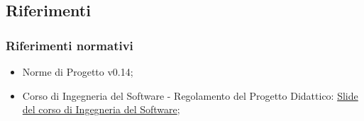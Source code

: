 \subsection{Riferimenti}
\label{subsec:Riferimenti}

\subsubsection{Riferimenti normativi}
\label{subsubsec:RiferimentiNormativi}
\begin{itemize}
    \item Norme di Progetto v0.14;
    \item Corso di Ingegneria del Software - Regolamento del Progetto Didattico:
    \newline
    \href{https://www.math.unipd.it/~tullio/IS-1/2024/Dispense/PD1.pdf}{Slide del corso di Ingegneria del Software};
\end{itemize}


